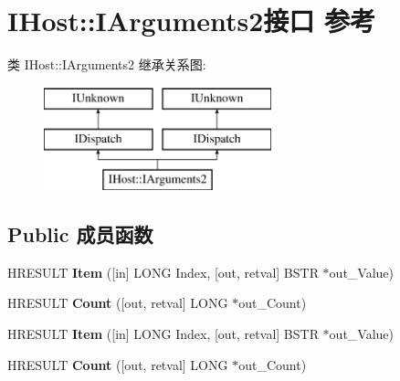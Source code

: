 \hypertarget{interface_i_host_1_1_i_arguments2}{}\section{I\+Host\+:\+:I\+Arguments2接口 参考}
\label{interface_i_host_1_1_i_arguments2}
类 I\+Host\+:\+:I\+Arguments2 继承关系图\+:\begin{figure}[H]
\begin{center}
\leavevmode
\includegraphics[height=3.000000cm]{interface_i_host_1_1_i_arguments2}
\end{center}
\end{figure}
\subsection*{Public 成员函数}
\begin{DoxyCompactItemize}
\item 
\mbox{\label{interface_i_host_1_1_i_arguments2_aa991de9be9de730a63de3165827e99f5}} 
H\+R\+E\+S\+U\+LT {\bfseries Item} (\mbox{[}in\mbox{]} L\+O\+NG Index, \mbox{[}out, retval\mbox{]} B\+S\+TR $\ast$out\+\_\+\+Value)
\item 
\mbox{\label{interface_i_host_1_1_i_arguments2_ac194889a102ad349cbeeceb38b8baa86}} 
H\+R\+E\+S\+U\+LT {\bfseries Count} (\mbox{[}out, retval\mbox{]} L\+O\+NG $\ast$out\+\_\+\+Count)
\item 
\mbox{\label{interface_i_host_1_1_i_arguments2_aa991de9be9de730a63de3165827e99f5}} 
H\+R\+E\+S\+U\+LT {\bfseries Item} (\mbox{[}in\mbox{]} L\+O\+NG Index, \mbox{[}out, retval\mbox{]} B\+S\+TR $\ast$out\+\_\+\+Value)
\item 
\mbox{\label{interface_i_host_1_1_i_arguments2_ac194889a102ad349cbeeceb38b8baa86}} 
H\+R\+E\+S\+U\+LT {\bfseries Count} (\mbox{[}out, retval\mbox{]} L\+O\+NG $\ast$out\+\_\+\+Count)
\end{DoxyCompactItemize}

